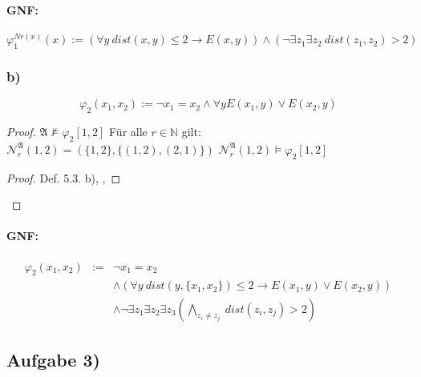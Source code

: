 \documentclass[12pt]{article}
\begin{document}
\paragraph{GNF:}
\[ \varphi_1^{Nr(x)}(x) := ( \forall y\ dist(x,y) \leq 2 \rightarrow E(x,y) ) 
  \land ( \neg \exists z_1 \exists z_2\ dist(z_1,z_2) > 2 )  
\] 


\subsubsection*{b)}

\[ \varphi_2(x_1,x_2) := \neg x_1=x_2 \land \forall y E(x_1,y) \lor E(x_2,y) \] 

\begin{proof}
   {}
   {}
   {}
   {$\mathfrak{A} \nvDash \varphi_2[1,2]$}
   { Für alle $r\in \mathbb{N}$ gilt: $\mathcal{N}_r^\mathfrak{A} (1,2) = 
    (\{1,2\},\{(1,2),(2,1)\})$ }
   {$\mathcal{N}_r^\mathfrak{A}(1,2) \models \varphi_2[1,2]$}
  \qedstep 
  \begin{proof}
    \pf Def. 5.3. b), , 
  \end{proof}
\end{proof}

\paragraph{GNF:}

\begin{eqnarray}
  \varphi_2(x_1,x_2) &:= &\neg x_1=x_2 \\ 
  && \land ( \forall y\ dist(y, \{x_1, x_2\})\leq 2 \rightarrow E(x_1,y) \lor E(x_2,y) ) \\ 
  && \land \neg \exists z_1 \exists z_2 \exists z_3 ( \bigwedge_{z_i\neq z_j}\ dist(z_i,z_j) > 2 )
\end{eqnarray}


\subsection*{Aufgabe 3)}
\end{document}
